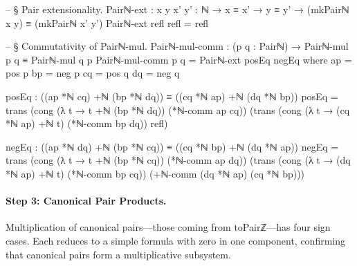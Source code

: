 \documentclass[11pt,a4paper]{book}
\def\texttt#1{#1}%
\begin{document}
\begin{code}
-- § Pair extensionality.
Pairℕ-ext : {x y x' y' : ℕ} → x ≡ x' → y ≡ y' → (mkPairℕ x y) ≡ (mkPairℕ x' y')
Pairℕ-ext refl refl = refl

-- § Commutativity of Pairℕ-mul.
Pairℕ-mul-comm : (p q : Pairℕ) → Pairℕ-mul p q ≡ Pairℕ-mul q p
Pairℕ-mul-comm p q =
  Pairℕ-ext posEq negEq
  where
    ap = pos p
    bp = neg p
    cq = pos q
    dq = neg q

    posEq : ((ap *ℕ cq) +ℕ (bp *ℕ dq)) ≡ ((cq *ℕ ap) +ℕ (dq *ℕ bp))
    posEq =
      trans
        (cong (λ t → t +ℕ (bp *ℕ dq)) (*ℕ-comm ap cq))
        (trans
          (cong (λ t → (cq *ℕ ap) +ℕ t) (*ℕ-comm bp dq))
          refl)

    negEq : ((ap *ℕ dq) +ℕ (bp *ℕ cq)) ≡ ((cq *ℕ bp) +ℕ (dq *ℕ ap))
    negEq =
      trans
        (cong (λ t → t +ℕ (bp *ℕ cq)) (*ℕ-comm ap dq))
        (trans
          (cong (λ t → (dq *ℕ ap) +ℕ t) (*ℕ-comm bp cq))
          (+ℕ-comm (dq *ℕ ap) (cq *ℕ bp)))
\end{code}

\paragraph{Step 3: Canonical Pair Products.}
Multiplication of canonical pairs---those coming from \texttt{toPairℤ}---has
four sign cases. Each reduces to a simple formula with zero in one component,
confirming that canonical pairs form a multiplicative subsystem.
\end{document}
